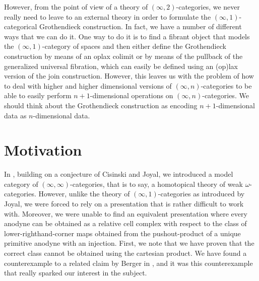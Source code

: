 \documentclass[a4paper,9pt]{amsart}
\theoremstyle{plain}   %
\theoremstyle{remark}
\theoremstyle{plain}
\begin{document}
However, from the point of view of a theory of \((\infty,2)\)-categories, we never really need to leave to an external theory in order to formulate the \((\infty,1)\)-categorical Grothendieck construction.  In fact, we have a number of different ways that we can do it.  One way to do it is to find a fibrant object that models the  \((\infty,1)\)-category of spaces and then either define the Grothendieck construction by means of an oplax colimit or by means of the pullback of the generalized universal fibration, which can easily be defined using an (op)lax version of the join construction. However, this leaves us with the problem of how to deal with higher and higher dimensional versions of \((\infty, n)\)-categories to be able to easily perform \(n+1\)-dimensional operations on \((\infty,n)\)-categories.  We should think about the Grothendieck construction as encoding \(n+1\)-dimensional data as \(n\)-dimensional data.  







\section{Motivation}
In \cite{gindipaper}, building on a conjecture of Cisinski and Joyal, we introduced a model category of \((\infty,\infty)\)-categories, that is to say, a homotopical theory of weak \(\omega\)-categories.  However, unlike the theory of \((\infty,1)\)-categories as introduced by Joyal, we were forced to rely on a presentation that is rather difficult to work with.  Moreover, we were unable to find an equivalent presentation where every anodyne can be obtained as a relative cell complex with respect to the class of lower-righthand-corner maps obtained from the pushout-product of a unique primitive anodyne with an injection.  First, we note that we have proven that the correct class cannot be obtained using the cartesian product.  We have found a counterexample to a related claim by Berger in \cite{berger-cellular-nerve}, and it was this counterexample that really sparked our interest in the subject.
\end{document}
